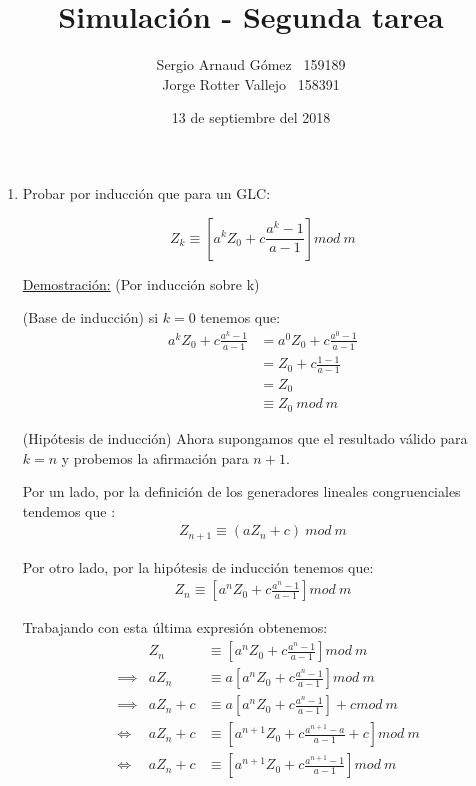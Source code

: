 \documentclass[12 pt]{article}\usepackage[]{graphicx}\usepackage[]{color}
\title{Simulación - Segunda tarea}
\author{Sergio Arnaud Gómez \quad \quad \ 159189 \\
        Jorge Rotter Vallejo \quad \quad \ 158391 }
\date{13 de septiembre del 2018}
\begin{document}
\maketitle
\begin{enumerate}
    

    \item Probar por inducción que para un GLC:
    
    \[ Z_k \equiv \left[a^kZ_0 + c\frac{a^k - 1}{a - 1}\right] mod \ m \] 
    
    \underline{Demostración:} (Por inducción sobre k)
    
    (Base de inducción) si $k=0$ tenemos que:
    \begin{align*}
        a^kZ_0 + c\frac{a ^k - 1}{a - 1} &=
        a^0Z_0 + c\frac{a^0 - 1}{a - 1}\\ &=
        Z_0 + c\frac{1 - 1}{a - 1} \\ &=
        Z_0 \\ &\equiv Z_0 \ mod  \ m
    \end{align*}
    
    (Hipótesis de inducción) Ahora supongamos que el resultado válido para $k=n$ y probemos la afirmación para $n+1$. 
    
    Por un lado, por la definición de los generadores lineales congruenciales tendemos que :
    \begin{align*}
        Z_{n+1} \equiv (aZ_n + c) \ mod \ m \tag{1} \label{eq:1}
    \end{align*}
    
    Por otro lado, por la hipótesis de inducción tenemos que:
    \begin{align*}
        Z_n \equiv \left[a^nZ_0 + c\frac{a^n - 1}{a - 1}\right] mod \ m 
    \end{align*}
    
    Trabajando con esta última expresión obtenemos:
    \begin{align*}
        & & Z_n &\equiv \left[a^nZ_0 + c\frac{a^n - 1}{a - 1}\right] mod \ m \\
        & \implies & aZ_n &\equiv a\left[a^nZ_0 + c\frac{a^n - 1}{a - 1}\right] mod \ m \\
        & \implies & aZ_n + c &\equiv a\left[a^nZ_0 + c\frac{a^n - 1}{a - 1}\right] + c mod \ m \\
        & \iff & aZ_n + c &\equiv \left[a^{n+1}Z_0 + c\frac{a^{n+1} - a}{a - 1} + c\right] mod \ m \\
        & \iff & aZ_n + c &\equiv \left[a^{n+1}Z_0 + c\frac{a^{n+1} - 1}{a - 1} \right] mod \ m  \tag{2} \label{eq:2} \\ 
    \end{align*}
    

\end{enumerate}
\end{document}
